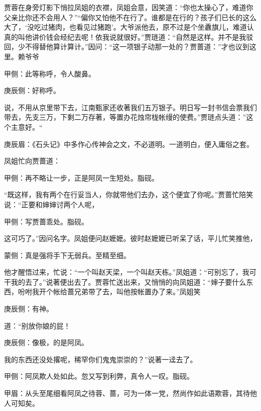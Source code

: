 \begin{parag}
    贾蓉在身旁灯影下悄拉凤姐的衣襟，凤姐会意，因笑道：“你也太操心了，难道你父亲比你还不会用人？”“偏你又怕他不在行了。谁都是在行的？孩子们已长的这么大了，‘没吃过猪肉，也看见过猪跑’。大爷派他去，原不过是个坐纛旗儿，难道认真的叫他讲价钱会经纪去呢！依我说就很好。”贾琏道：“自然是这样。并不是我驳回，少不得替他算计算计。”因问：“这一项银子动那一处的？贾蔷道：”才也议到这里。赖爷爷\begin{note}甲侧：此等称呼，令人酸鼻。\end{note}\begin{note}庚辰侧：好称呼。\end{note}说，不用从京里带下去，江南甄家还收著我们五万银子。明日写一封书信会票我们带去，先支三万，下剩二万存著，等置办花烛帘栊帐缦的使费。”贾琏点头道：”这个主意好。“\begin{note}庚辰眉：《石头记》中多作心传神会之文，不必道明。一道明白，便入庸俗之套。\end{note}
\end{parag}


\begin{parag}
    凤姐忙向贾蔷道：\begin{note}甲侧：再不略让一步，正是阿凤一生短处。脂砚。\end{note}“既这样，我有两个在行妥当人，你就带他们去办，这个便宜了你呢。”贾蔷忙陪笑说：“正要和婶婶讨两个人呢，\begin{note}甲侧：写贾蔷乖处。脂砚。\end{note}这可巧了。”因问名字。凤姐便问赵嬷嬷。彼时赵嬷嬷已听呆了话，平儿忙笑推他，\begin{note}蒙侧：真是强将手下无弱兵。至精至细。\end{note}他才醒悟过来，忙说：“一个叫赵天梁，一个叫赵天栋。”凤姐道：“可别忘了，我可干我的去了。”说著便出去了。贾蓉忙送出来，又悄悄的向凤姐道：“婶子要什么东西，吩咐我开个帐给蔷兄弟带了去，叫他按帐置办了来。”凤姐笑\begin{note}庚辰侧：有神。\end{note}道：“别放你娘的屁！\begin{note}庚辰侧：像极，的是阿凤。\end{note}我的东西还没处撂呢，稀罕你们鬼鬼崇崇的？”说著一迳去了。\begin{note}甲侧：阿凤欺人处如此。忽又写到利弊，真令人一叹。脂砚。\end{note}\begin{note}甲眉：从头至尾细看阿凤之待蓉、蔷，可为一体一党，然尚作如此语欺蓉，其待他人可知矣。\end{note}
\end{parag}


